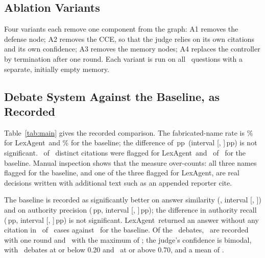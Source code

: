 \documentclass[conference]{IEEEtran}
\newcommand{\sys}{LexAgent}
\newcommand{\pp}{\,pp}
\begin{document}
\subsection{Ablation Variants}
Four variants each remove one component from the graph: A1 removes the defense node; A2 removes the CCE, so that the judge relies on its own citations and its own confidence; A3 removes the memory nodes; A4 replaces the controller by termination after one round. Each variant is run on all \ResTestCases\ questions with a separate, initially empty memory.

\subsection{Debate System Against the Baseline, as Recorded}
Table~\ref{tab:main} gives the recorded comparison. The fabricated-name rate is \ResLexHR\% for \sys\ and \ResBaseHR\% for the baseline; the difference of \ResDiffHR\pp\ (interval [\ResDiffHRLow, \ResDiffHRHigh]\pp) is not significant. \ResLexFlagged\ of \ResLexCites\ distinct citations were flagged for \sys\ and \ResBaseFlagged\ of \ResBaseCites\ for the baseline. Manual inspection shows that the measure over-counts: all three names flagged for the baseline, and one of the three flagged for \sys, are real decisions written with additional text such as an appended reporter cite.

The baseline is recorded as significantly better on answer similarity (\ResDiffASS, interval [\ResDiffASSLow, \ResDiffASSHigh]) and on authority precision (\ResDiffAP\pp, interval [\ResDiffAPLow, \ResDiffAPHigh]\pp); the difference in authority recall (\ResDiffAR\pp, interval [\ResDiffARLow, \ResDiffARHigh]\pp) is not significant. \sys\ returned an answer without any citation in \ResLexNoCiteAnswers\ of \ResTestCases\ cases against \ResBaseNoCiteAnswers\ for the baseline. Of the \ResTestCases\ debates, \ResLexRoundsOne\ are recorded with one round and \ResLexRoundsMax\ with the maximum of \ResLexMaxRounds; the judge's confidence is bimodal, with \ResLexConfLow\ debates at or below 0.20 and \ResLexConfHigh\ at or above 0.70, and a mean of \ResLexConf.
\end{document}
